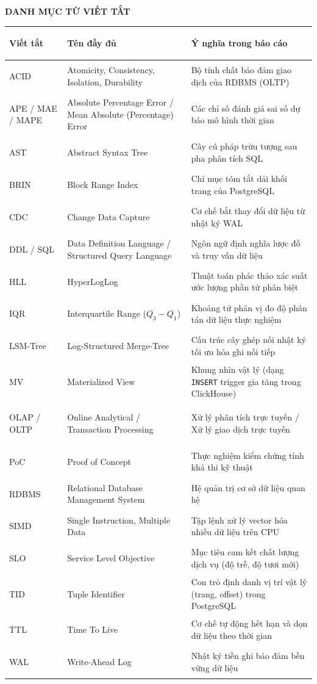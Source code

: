 \documentclass[13pt,a4paper]{report}
\begin{document}
{}
\begin{center}
    {\Large\textbf{DANH MỤC TỪ VIẾT TẮT}}
\end{center}
\vspace{0.3cm}

\begin{table}[!htb]
\centering
\scriptsize
\renewcommand{\arraystretch}{1.04}
\begin{tabularx}{\textwidth}{>{\bfseries\raggedright\arraybackslash}p{3.1cm} >{\raggedright\arraybackslash}p{5.1cm} >{\raggedright\arraybackslash}X}
\toprule
\textbf{Viết tắt} & \textbf{Tên đầy đủ} & \textbf{Ý nghĩa trong báo cáo} \\
\midrule
ACID & Atomicity, Consistency, Isolation, Durability & Bộ tính chất bảo đảm giao dịch của RDBMS (OLTP) \\
APE / MAE / MAPE & Absolute Percentage Error / Mean Absolute (Percentage) Error & Các chỉ số đánh giá sai số dự báo mô hình thời gian \\
AST & Abstract Syntax Tree & Cây cú pháp trừu tượng sau pha phân tích SQL \\
BRIN & Block Range Index & Chỉ mục tóm tắt dải khối trang của PostgreSQL \\
CDC & Change Data Capture & Cơ chế bắt thay đổi dữ liệu từ nhật ký WAL \\
DDL / SQL & Data Definition Language / Structured Query Language & Ngôn ngữ định nghĩa lược đồ và truy vấn dữ liệu \\
HLL & HyperLogLog & Thuật toán phác thảo xác suất ước lượng phần tử phân biệt \\
IQR & Interquartile Range ($Q_3 - Q_1$) & Khoảng tứ phân vị đo độ phân tán dữ liệu thực nghiệm \\
LSM-Tree & Log-Structured Merge-Tree & Cấu trúc cây ghép nối nhật ký tối ưu hóa ghi nối tiếp \\
MV & Materialized View & Khung nhìn vật lý (dạng \texttt{INSERT} trigger gia tăng trong ClickHouse) \\
OLAP / OLTP & Online Analytical / Transaction Processing & Xử lý phân tích trực tuyến / Xử lý giao dịch trực tuyến \\
PoC & Proof of Concept & Thực nghiệm kiểm chứng tính khả thi kỹ thuật \\
RDBMS & Relational Database Management System & Hệ quản trị cơ sở dữ liệu quan hệ \\
SIMD & Single Instruction, Multiple Data & Tập lệnh xử lý vector hóa nhiều dữ liệu trên CPU \\
SLO & Service Level Objective & Mục tiêu cam kết chất lượng dịch vụ (độ trễ, độ tươi mới) \\
TID & Tuple Identifier & Con trỏ định danh vị trí vật lý (trang, offset) trong PostgreSQL \\
TTL & Time To Live & Cơ chế tự động hết hạn và dọn dữ liệu theo thời gian \\
WAL & Write-Ahead Log & Nhật ký tiền ghi bảo đảm bền vững dữ liệu \\
\bottomrule
\end{tabularx}
\end{table}
\newpage
\end{document}
